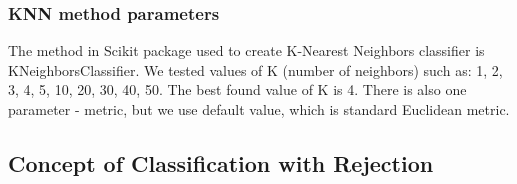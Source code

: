\documentclass{llncs}
\begin{document}
\subsubsection{KNN method parameters}
The method in Scikit package used to create K-Nearest Neighbors classifier is KNeighborsClassifier. We tested values of K (number of neighbors) such as: 1, 2, 3, 4, 5, 10, 20, 30, 40, 50. The best found value of K is 4. There is also one parameter - metric, but we use default value, which is standard Euclidean metric.


\subsection{Concept of Classification with Rejection}
  \label{subsec:ClassificationAndRejection}
\end{document}

